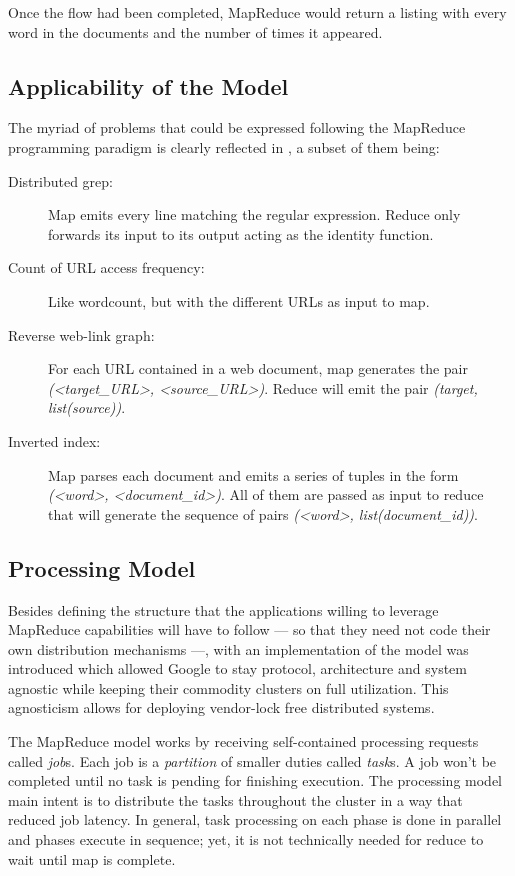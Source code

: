 Once the flow had been completed, MapReduce would return a listing with every word in the documents and the number of times it appeared.

\subsection{Applicability of the Model}\label{subsec:aplicabilidad}
\noindent The myriad of problems that could be expressed following the MapReduce programming paradigm is clearly reflected in \cite{googlemapreduce}, a subset of them being:

\begin{description}
 \item[Distributed grep:] Map emits every line matching the regular expression. Reduce only forwards its input to its output acting as the identity function.
 \item[Count of URL access frequency:] Like wordcount, but with the different URLs as input to map.
 \item[Reverse web-link graph:] For each URL contained in a web document, map generates the pair \emph{(<target\_URL>, <source\_URL>)}. Reduce will emit the pair \emph{(target, list(source))}.
 \item[Inverted index:] Map parses each document and emits a series of tuples in the form \emph{(<word>, <document\_id>)}. All of them are passed as input to reduce that will generate the sequence of pairs \emph{(<word>, list(document\_id))}.
\end{description}

\subsection{Processing Model}\label{subsec:processingmodel}
\noindent Besides defining the structure that the applications willing to leverage MapReduce capabilities will have to follow --- so that they need not code their own distribution mechanisms ---, with \cite{googlemapreduce} an implementation of the model was introduced which allowed Google to stay protocol, architecture and system agnostic while keeping their commodity clusters on full utilization. This agnosticism allows for deploying vendor-lock free distributed systems.

The MapReduce model works by receiving self-contained processing requests called \emph{job}s. Each job is a \emph{partition} of smaller duties called \emph{task}s. A job won't be completed until no task is pending for finishing execution. The processing model main intent is to distribute the tasks throughout the cluster in a way that reduced job latency. In general, task processing on each phase is done in parallel and phases execute in sequence; yet, it is not technically needed for reduce to wait until map is complete.

